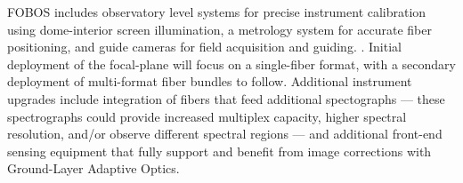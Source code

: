 FOBOS includes observatory level systems for precise instrument
calibration using dome-interior screen illumination, a metrology
system for accurate fiber positioning, and guide cameras for field
acquisition and guiding. . Initial deployment of the focal-plane
will focus on a single-fiber format, with a secondary deployment of
multi-format fiber bundles to follow. Additional instrument upgrades
include integration of fibers that feed additional spectographs ---
these spectrographs could provide increased multiplex capacity,
higher spectral resolution, and/or observe different spectral regions
--- and additional front-end sensing equipment that fully support and
benefit from image corrections with Ground-Layer Adaptive Optics.
